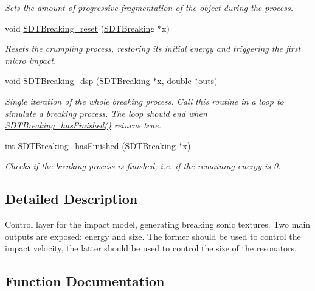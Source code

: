 \begin{DoxyCompactItemize}
\begin{DoxyCompactList}\small\item\em Sets the amount of progressive fragmentation of the object during the process. \end{DoxyCompactList}\item 
void \hyperlink{group__breaking_ga4fa0c4311c67d886798cce4c97a97146}{S\+D\+T\+Breaking\+\_\+reset} (\hyperlink{group__breaking_gaf66ba3e9569d061a0d6337a24bce1dc5}{S\+D\+T\+Breaking} $\ast$x)
\begin{DoxyCompactList}\small\item\em Resets the crumpling process, restoring its initial energy and triggering the first micro impact. \end{DoxyCompactList}\item 
void \hyperlink{group__breaking_ga0d441bf8dd961599eb3a58f1da1fb020}{S\+D\+T\+Breaking\+\_\+dsp} (\hyperlink{group__breaking_gaf66ba3e9569d061a0d6337a24bce1dc5}{S\+D\+T\+Breaking} $\ast$x, double $\ast$outs)
\begin{DoxyCompactList}\small\item\em Single iteration of the whole breaking process. Call this routine in a loop to simulate a breaking process. The loop should end when \hyperlink{group__breaking_ga4712157447efae292a131e389beb265a}{S\+D\+T\+Breaking\+\_\+has\+Finished()} returns true. \end{DoxyCompactList}\item 
int \hyperlink{group__breaking_ga4712157447efae292a131e389beb265a}{S\+D\+T\+Breaking\+\_\+has\+Finished} (\hyperlink{group__breaking_gaf66ba3e9569d061a0d6337a24bce1dc5}{S\+D\+T\+Breaking} $\ast$x)
\begin{DoxyCompactList}\small\item\em Checks if the breaking process is finished, i.\+e. if the remaining energy is 0. \end{DoxyCompactList}\end{DoxyCompactItemize}


\subsection{Detailed Description}
Control layer for the impact model, generating breaking sonic textures. Two main outputs are exposed\+: energy and size. The former should be used to control the impact velocity, the latter should be used to control the size of the resonators. 

\subsection{Function Documentation}
\hypertarget{group__breaking_ga0d441bf8dd961599eb3a58f1da1fb020}{}

